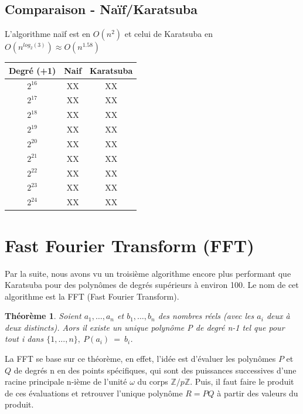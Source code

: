 \documentclass[12pt, a4paper]{article}
\begin{document}
\subsection{Comparaison - Naïf/Karatsuba}
L'algorithme naïf est en $O(n^2)$ et celui de Karatsuba en $O(n^{log_2(3)}) \approx O(n^{1.58})$ \\

\begin{center}
\begin{tabular}{||c c c||}
\hline
Degré (+1) & Naif & Karatsuba \\
\hline\hline
$2^{16}$ & XX & XX \\
\hline
$2^{17}$ & XX & XX \\
\hline
$2^{18}$ & XX & XX \\
\hline
$2^{19}$ & XX & XX \\
\hline
$2^{20}$ & XX & XX \\
\hline
$2^{21}$ & XX & XX \\
\hline
$2^{22}$ & XX & XX \\
\hline
$2^{23}$ & XX & XX \\
\hline
$2^{24}$ & XX & XX \\
\hline
\end{tabular}
\end{center}


\section{Fast Fourier Transform (FFT)}

Par la suite, nous avons vu un troisième algorithme encore plus performant que Karatsuba pour des polynômes de degrés supérieurs à environ 100. Le nom de cet algorithme est la FFT (Fast Fourier Transform). 

\newtheorem{Thm1}{Théorème}
\begin{Thm1}
Soient $a_1,\dots,a_n$ et $b_1,\dots,b_n$ des nombres réels (avec les $a_i$ deux à deux distincts). Aors il existe un unique polynôme P de degré n-1 tel que pour tout i dans $\{1,..., n\},\ P(a_i)\ =\ b_i$.
\end{Thm1}

La FFT se base sur ce théorème, en effet, l’idée est d’évaluer les polynômes $P$ et $Q$ de degrés n en des points spécifiques, qui sont des puissances successives d'une racine principale n-ième de l'unité $\omega$ du corps $\mathbb{Z}/p\mathbb{Z}$. Puis, il faut faire le produit de ces évaluations et retrouver l’unique polynôme $R=PQ$ à partir des valeurs du produit. \\
 
\end{document}
